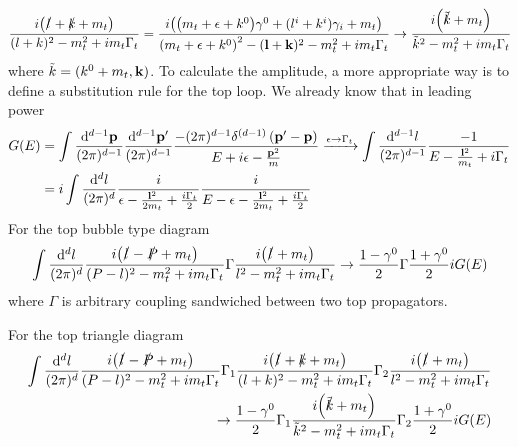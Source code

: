 \documentclass[english,aps,prd,preprint,showpacs,superscriptaddress,groupedaddress,fixfloats]{revtex4-1}
\newcommand{\mmd}[2][d]{\frac{\dd^{#1}{#2}}{(2\pi)^{#1}}}
\begin{document}
\begin{align}
	\frac{i\pqty{\slashed l+\slashed k+m_t}}{(l+k)^2-m_t^2+im_t\Gamma_t}=\frac{i\pqty{\pqty{m_t+\epsilon+k^0}\gamma^0+(l^i+k^i)\gamma_i+m_t}}{\pqty{m_t+\epsilon+k^0}^2-(\vb{l}+\vb{k})^2-m_t^2+im_t\Gamma_t}\to \frac{i\pqty{\slashed{\tilde{k}}+m_t}}{\tilde{k}^2-m_t^2+im_t\Gamma_t}
\end{align}
where $\tilde{k}=(k^0+m_t,\vb{k})$. To calculate the amplitude, a more appropriate way is to define a substitution rule for the top loop. We already know that in leading power
\begin{align}
	G(E)&=\int \frac{\dd^{d-1} \mathbf{p}}{(2 \pi)^{d-1}} \frac{\dd^{d-1} \mathbf{p}^{\prime}}{(2 \pi)^{d-1}}\frac{-(2 \pi)^{d-1} \delta^{(d-1)}\left(\mathbf{p}^{\prime}-\mathbf{p}\right)}{E+i \epsilon-\frac{\mathbf{p}^{2}}{m}}\xrightarrow{\epsilon\to\Gamma_t}\int\mmd[d-1]{l}\frac{-1}{E-\frac{\vb{l}^2}{m_t}+i\Gamma_t}\\&=i\int\mmd[d]{l}\frac{i}{\epsilon-\frac{\vb{l}^2}{2m_t}+\frac{i\Gamma_t}{2}}\frac{i}{E-\epsilon-\frac{\vb{l}^2}{2m_t}+\frac{i\Gamma_t}{2}}
\end{align}
For the top bubble type diagram
\begin{align*}
	\int\mmd{l}\frac{i\pqty{\slashed l-\slashed P+m_t}}{(P-l)^2-m_t^2+im_t\Gamma_t}\Gamma\frac{i\pqty{\slashed l +m_t}}{l^2-m_t^2+{im_t\Gamma_t}}\to\frac{1-\gamma^0}{2}\Gamma\frac{1+\gamma^0}{2}iG(E)
\end{align*}
where $\Gamma$ is arbitrary coupling sandwiched between two top propagators. 

For the top triangle diagram
\begin{align*}
	\int\mmd{l}\frac{i\pqty{\slashed l-\slashed P+m_t}}{(P-l)^2-m_t^2+im_t\Gamma_t}\Gamma_1\frac{i\pqty{\slashed l+\slashed k+m_t}}{(l+k)^2-m_t^2+im_t\Gamma_t}\Gamma_2\frac{i\pqty{\slashed l +m_t}}{l^2-m_t^2+{im_t\Gamma_t}}\\\to\frac{1-\gamma^0}{2}\Gamma_1\frac{i\pqty{\slashed{\tilde{k}}+m_t}}{\tilde{k}^2-m_t^2+im_t\Gamma_t}\Gamma_2\frac{1+\gamma^0}{2}iG(E)
\end{align*}
\end{document}
